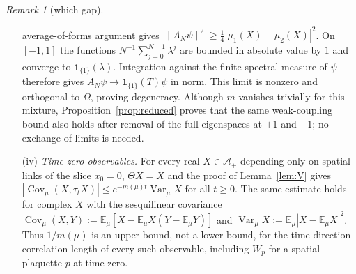 \documentclass[11pt,a4paper]{article}
\theoremstyle{plain}
\theoremstyle{definition}
\theoremstyle{remark}
\newtheorem{remark}[theorem]{Remark}
\numberwithin{equation}{section}
\newcommand{\E}{\mathbb{E}}
\newcommand{\Var}{\operatorname{Var}}
\newcommand{\Cov}{\operatorname{Cov}}
\newcommand{\Th}{\Theta}
\begin{document}
\begin{remark}[which gap]
\begin{enumerate}
average-of-forms argument gives $\|A_N\psi\|^2\ge\frac14|\mu_1(X)-\mu_2(X)|^2$. On $[-1,1]$ the functions
$N^{-1}\sum_{j=0}^{N-1}\lambda^j$ are bounded in absolute value by $1$ and converge to $\mathbf1_{\{1\}}(\lambda)$.
Integration against the finite spectral measure of $\psi$ therefore gives
$A_N\psi\to\mathbf1_{\{1\}}(T)\psi$ in norm. This limit is nonzero and orthogonal to $\Omega$, proving degeneracy.
Although $m$ vanishes trivially for this mixture, Proposition~\ref{prop:reduced} proves that the same weak-coupling bound also holds
after removal of the full eigenspaces at $+1$ and $-1$; no exchange of limits is needed.
\item[(iv)] \emph{Time-zero observables.} For every real $X\in\mathcal A_+$ depending only on spatial links of the slice $x_0=0$,
$\Th X=X$ and the proof of Lemma~\ref{lem:V} gives $|\Cov_\mu(X,\tau_tX)|\le e^{-m(\mu)t}\Var_\mu X$ for all $t\ge0$.
The same estimate holds for complex $X$ with the sesquilinear covariance
$\Cov_\mu(X,Y):=\E_\mu[\overline{X-\E_\mu X}(Y-\E_\mu Y)]$ and $\Var_\mu X:=\E_\mu|X-\E_\mu X|^2$.
Thus $1/m(\mu)$ is an upper bound,
not a lower bound, for the time-direction correlation length of every such observable, including $W_p$ for a spatial plaquette $p$ at
time zero.
\end{enumerate}
\end{remark}
\end{document}
